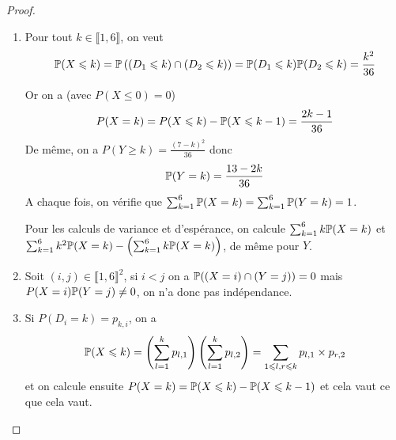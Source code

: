 \documentclass[12pt]{article}
\begin{document}
\begin{proof}
    \phantom{}
    \begin{enumerate}
        \item Pour tout $k\in\llbracket1,6\rrbracket$, on veut
        \begin{equation}
            \P(X\leqslant k)=\P\left(\left(D_{1}\leqslant k\right)\cap\left(D_{2}\leqslant k\right)\right)=\P(D_{1}\leqslant k)\P(D_{2}\leqslant k)=\frac{k^{2}}{36}
        \end{equation}

        Or on a (avec $P(X\leqslant 0)=0$)
        \begin{equation}
            P(X=k)=P(X\leqslant k)-\P(X\leqslant k-1)=\frac{2k-1}{36}
        \end{equation}
        De même, on a $P(Y\geqslant k)=\frac{(7-k)^{2}}{36}$ donc
        \begin{equation}
            \P(Y=k)=\frac{13-2k}{36}
        \end{equation}
        A chaque fois, on vérifie que $\sum_{k=1}^{6}\P(X=k)=\sum_{k=1}^{6}\P(Y=k)=1$.

        Pour les calculs de variance et d'espérance, on calcule $\sum_{k=1}^{6}k\P(X=k)$ et $\sum_{k=1}^{6}k^{2}\P(X=k)-\left(\sum_{k=1}^{6}k\P(X=k)\right)$, de même pour $Y$.

        \item Soit $(i,j)\in\llbracket1,6\rrbracket^{2}$, si $i<j$ on a $\P((X=i)\cap (Y=j))=0$ mais $P(X=i)\P(Y=j)\neq0$, on n'a donc pas indépendance.
        
        \item Si $P(D_{i}=k)=p_{k,i}$, on a 
        \begin{equation}
            \P(X\leqslant k)=\left(\sum_{l=1}^{k}p_{l,1}\right)\left(\sum_{l=1}^{k}p_{l,2}\right)=\sum_{1\leqslant l,r\leqslant k}p_{l,1}\times p_{r,2}
        \end{equation}
        et on calcule ensuite $P(X=k)=\P(X\leqslant k)-\P(X\leqslant k-1)$ et cela vaut ce que cela vaut.
    \end{enumerate}
\end{proof}
\end{document}
